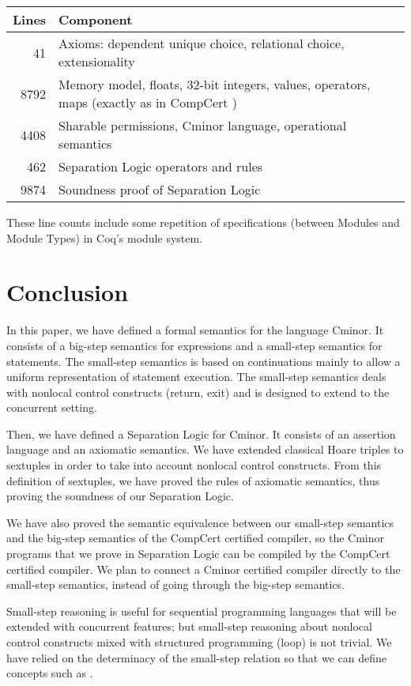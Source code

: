 \documentclass{llncs}
\newcommand{\cminor}{Cminor}
\newcommand{\compcert}{CompCert}
\begin{document}
\begin{tabular}{r@{\quad} p{4.1in}}
Lines & Component\\ \hline
41 & Axioms: dependent unique choice, relational choice,
extensionality \\
8792 & Memory model, floats, 32-bit integers, values, operators, maps 
(exactly as in CompCert \cite{leroy06}) \\
4408 & Sharable permissions, \cminor{} language, operational semantics \\
462 & Separation Logic operators and rules\\
9874 & Soundness proof of Separation Logic
\end{tabular}

\noindent These line counts include some repetition of specifications (between Modules
and Module Types) in Coq's module system.
\vspace{-8pt}

\section{Conclusion}
In this paper, we have defined a formal semantics for the language \cminor. It consists of
a big-step semantics for expressions and a small-step semantics for statements.
The small-step semantics is based on continuations mainly to allow a uniform
representation of statement execution.
The small-step semantics deals with nonlocal control constructs (return, exit)
and is designed to extend to the concurrent setting.

Then, we have defined a Separation Logic for \cminor. It consists of an assertion language
and an axiomatic semantics.
We have extended classical Hoare triples to sextuples in order to take into account
nonlocal control constructs.
From this definition of sextuples, we have proved the rules of axiomatic semantics,
thus proving the soundness of our Separation Logic.

We have also  proved the semantic equivalence between our
small-step semantics and the big-step semantics of the \compcert{} certified compiler,
so the \cminor{} programs that we prove in Separation Logic can be compiled by the
\compcert{} certified compiler.
We plan to connect 
a \cminor{} certified compiler directly to the small-step semantics, instead
of going through the big-step semantics.  

Small-step reasoning is useful for sequential programming languages
that will be extended with concurrent features;
but small-step reasoning about 
nonlocal control constructs
mixed with structured programming (loop) is not trivial.
We have relied on
the determinacy of the small-step relation so that we
can define concepts such as .




\end{document}
